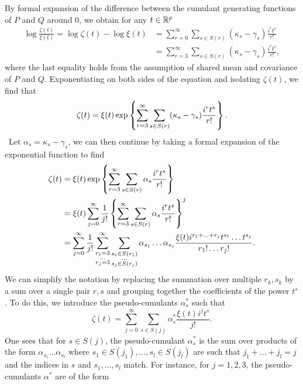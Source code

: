 By formal expansion of the difference between the cumulant generating functions of $P$ and $Q$ around 0, we obtain for any $t \in {\mathbb{R}^p}$
\begin{align*}
    \log \frac{\zeta(t)}{\xi(t)}
    = \log \zeta(t) - \log \xi(t) 
    &= \sum_{r=0}^\infty \sum_{s \in S(r)} (\kappa_s - \gamma_s)\frac{i^r t^s}{r!}\\
    &= \sum_{r=3}^\infty \sum_{s \in S(r)} (\kappa_s - \gamma_s)\frac{i^r t^s}{r!},
\end{align*}
where the last equality holds from the assumption of shared mean and covariance of $P$ and $Q$. Exponentiating on both sides of the equation and isolating $\zeta(t)$, we find that
\begin{equation*}
    \zeta(t) = \xi(t)\exp\left\{\sum_{r=3}^\infty \sum_{s \in S(r)} (\kappa_s - \gamma_s)\frac{i^r t^s}{r!}\right\}.
\end{equation*}
\
Let $\alpha_s = \kappa_s - \gamma_s$, we can then continue by taking a formal expansion of the exponential function to find
\begin{align*}
    \zeta(t)
    &= \xi(t)\exp\left\{\sum_{r=3}^\infty \sum_{s \in S(r)} \alpha_s\frac{i^r t^s}{r!}\right\}\\
    &= \xi(t)\sum_{j=0}^\infty \frac{1}{j!} \left\{\sum_{r=3}^\infty \sum_{s \in S(r)} \alpha_s\frac{i^r t^s}{r!}\right\}^j \\
    &=
    \sum_{j=0}^\infty \frac{1}{j!} 
    \sum_{\substack{r_1 = 3\\ \ldots \\r_j = 3}}^\infty
    \sum_{\substack{s_1 \in S(r_1)\\ \ldots \\s_j \in S(r_j)}}
    \alpha_{s_1}\ldots\alpha_{s_j}
    \frac{
        \xi(t) i^{r_1 + \ldots + r_j}
        t^{s_1} \ldots t^{s_j}
    }{
        r_1! \ldots r_j!
    }.
\end{align*}
We can simplify the notation by replacing the summation over multiple $r_k, s_k$ by a sum over a single pair $r, s$ and grouping together the coefficients of the power $t^s$. To do this, we introduce the pseudo-cumulants $\alpha^*_s$ such that
\begin{equation} \label{eq-char-expansion}
    \zeta(t) = 
    \sum_{j=0}^\infty 
    \sum_{s \in S(j)}
    \alpha^*_s \frac{\xi(t) i^{j} t^{s}}{j!}.
\end{equation}
One sees that for $s \in S(j)$, the pseudo-cumulant $\alpha^*_s$ is the sum over products of the form $\alpha_{s_1}\ldots\alpha_{s_l}$ where $s_1 \in S(j_1), \ldots, s_l \in S(j_l)$ are such that $j_1 + \ldots + j_l = j$ and the indices in $s$ and $s_1, \ldots, s_l$ match. For instance, for $j = 1, 2, 3$, the pseudo-cumulants $\alpha^*$ are of the form
